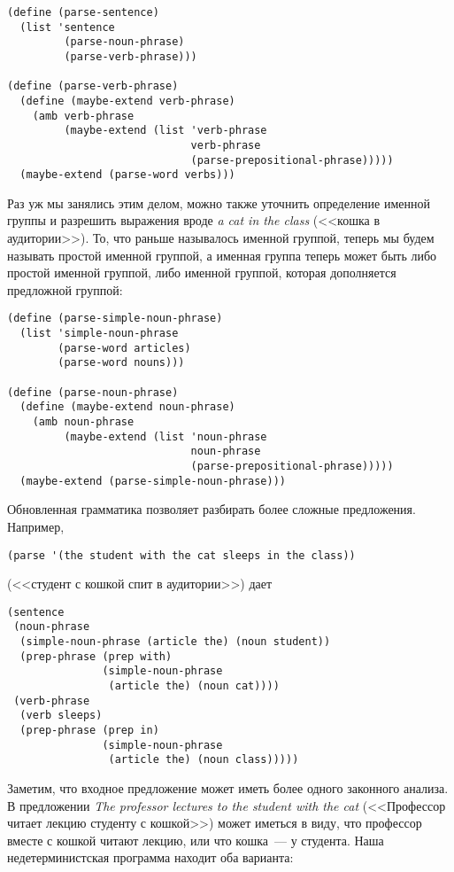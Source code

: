 \begin{Verbatim}[fontsize=\small]
(define (parse-sentence)
  (list 'sentence
         (parse-noun-phrase)
         (parse-verb-phrase)))

(define (parse-verb-phrase)
  (define (maybe-extend verb-phrase)
    (amb verb-phrase
         (maybe-extend (list 'verb-phrase
                             verb-phrase
                             (parse-prepositional-phrase)))))
  (maybe-extend (parse-word verbs)))
\end{Verbatim}

Раз уж мы занялись этим делом, можно также уточнить определение именной группы и
разрешить выражения вроде {\em a cat in the class} (<<кошка в
аудитории>>).  То, что раньше называлось именной группой, теперь мы
будем называть простой именной группой, а именная группа теперь может
быть либо простой именной группой, либо именной группой, которая
дополняется предложной группой:

\begin{Verbatim}[fontsize=\small]
(define (parse-simple-noun-phrase)
  (list 'simple-noun-phrase
        (parse-word articles)
        (parse-word nouns)))

(define (parse-noun-phrase)
  (define (maybe-extend noun-phrase)
    (amb noun-phrase
         (maybe-extend (list 'noun-phrase
                             noun-phrase
                             (parse-prepositional-phrase)))))
  (maybe-extend (parse-simple-noun-phrase)))
\end{Verbatim}

Обновленная грамматика позволяет разбирать более
сложные предложения.  Например,

\begin{Verbatim}[fontsize=\small]
(parse '(the student with the cat sleeps in the class))
\end{Verbatim}
(<<студент с кошкой спит в аудитории>>) дает

\begin{Verbatim}[fontsize=\small]
(sentence
 (noun-phrase
  (simple-noun-phrase (article the) (noun student))
  (prep-phrase (prep with)
               (simple-noun-phrase
                (article the) (noun cat))))
 (verb-phrase
  (verb sleeps)
  (prep-phrase (prep in)
               (simple-noun-phrase
                (article the) (noun class)))))
\end{Verbatim}

Заметим, что входное предложение может иметь более одного
законного анализа.  В предложении {\em The professor lectures to the
student with the cat} (<<Профессор читает лекцию студенту с
кошкой>>) может иметься в виду, что профессор вместе с кошкой читают
лекцию, или что кошка~--- у студента.  Наша недетерминистская
программа находит оба варианта:

